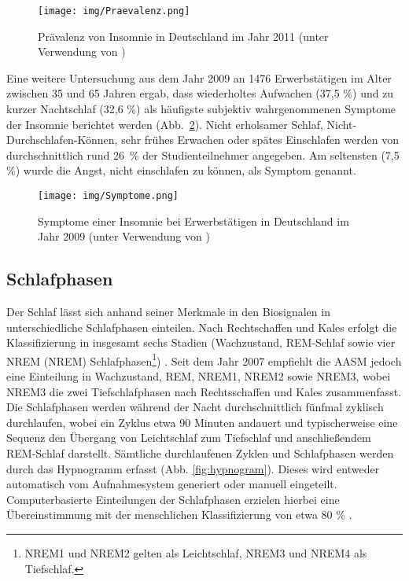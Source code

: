 \begin{figure}[H]
	\centering
	\texttt{[image: img/Praevalenz.png]}
	\caption[Prävalenz von Insomnie]{Prävalenz von Insomnie in Deutschland im Jahr 2011 (unter Verwendung von \parencite{schlack_haufigkeit_2013})}
	\label{fig:praevalenz}
\end{figure}

Eine weitere Untersuchung aus dem Jahr 2009 an 1476 Erwerbstätigen im Alter zwischen 35 und 65 Jahren ergab, dass wiederholtes Aufwachen (37,5 \%) und zu kurzer Nachtschlaf (32,6 \%) als häufigste subjektiv wahrgenommenen Symptome der Insomnie berichtet werden (Abb.~\ref{fig:symptome}). Nicht erholsamer Schlaf, Nicht-Durchschlafen-Können, sehr frühes Erwachen oder spätes Einschlafen werden von durchschnittlich rund 26~\% der Studienteilnehmer angegeben. Am seltensten (7,5 \%) wurde die Angst, nicht einschlafen zu können, als Symptom genannt. \parencite{dak_forschung_gesundheitsreport_2010}

\begin{figure}[H]
	\centering
	\texttt{[image: img/Symptome.png]}
	\caption[Symptome der Insomnie]{Symptome einer Insomnie bei Erwerbstätigen in Deutschland im Jahr 2009 (unter Verwendung von \parencite{dak_forschung_gesundheitsreport_2010})}
	\label{fig:symptome}
\end{figure}

\subsection{Schlafphasen}\label{schlafphasen} 

Der Schlaf lässt sich anhand seiner Merkmale in den Biosignalen in unterschiedliche Schlafphasen einteilen. Nach Rechtschaffen und Kales erfolgt die Klassifizierung in insgesamt sechs Stadien (Wachzustand, \acs{REM}-Schlaf sowie vier \acl{NREM} (\acs{NREM}) Schlafphasen\footnote{\acs{NREM}1 und \acs{NREM}2 gelten als Leichtschlaf, \acs{NREM}3 und \acs{NREM}4 als Tiefschlaf.}) \parencite{rechtschaffen_manual_1968}. Seit dem Jahr 2007 empfiehlt die \acs{AASM} jedoch eine Einteilung in Wachzustand, \acs{REM}, \acs{NREM}1, \acs{NREM}2 sowie \acs{NREM}3, wobei \acs{NREM}3 die zwei Tiefschlafphasen nach Rechtsschaffen und Kales zusammenfasst. Die Schlafphasen werden während der Nacht durchschnittlich fünfmal zyklisch durchlaufen, wobei ein Zyklus etwa 90 Minuten andauert und typischerweise eine Sequenz den Übergang von Leichtschlaf zum Tiefschlaf und anschließendem REM-Schlaf darstellt. Sämtliche durchlaufenen Zyklen und Schlafphasen werden durch das Hypnogramm erfasst (Abb. \ref{fig:hypnogram}). Dieses wird entweder automatisch vom Aufnahmesystem generiert oder manuell eingeteilt. Computerbasierte Einteilungen der Schlafphasen erzielen hierbei eine Übereinstimmung mit der menschlichen Klassifizierung von etwa 80 \% \parencite{rasche_update_2003, penzel_computer_2000}. \parencite{happe_schlafmedizin_2009, iber_aasm_2007}

